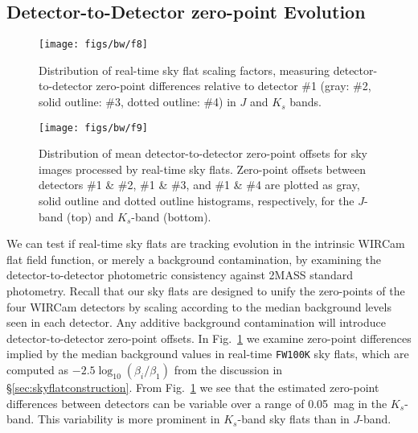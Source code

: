 \documentclass[iop,tighten]{emulateapj}
\newcommand{\Fig}[1]{Fig.~\ref{fig:#1}}  %
\newcommand{\Sec}[1]{\S\ref{sec:#1}}  %
\begin{document}
\subsection{Detector-to-Detector zero-point Evolution}
\label{sec:detector_zp}

\begin{figure}[t]
\centering
\texttt{[image: figs/bw/f8]}
\caption{Distribution of real-time sky flat scaling factors, measuring detector-to-detector zero-point differences relative to detector \#1 (gray: \#2, solid outline: \#3, dotted outline: \#4) in $J$ and $K_s$ bands.
}
\label{fig:fw100k_zpdiff}
\end{figure}

\begin{figure}[t]
\centering
\texttt{[image: figs/bw/f9]}
\caption{Distribution of mean detector-to-detector zero-point offsets for sky images processed by real-time sky flats.
Zero-point offsets between detectors \#1 \& \#2, \#1 \& \#3, and \#1 \& \#4 are plotted as
gray, solid outline and dotted outline histograms, respectively, for the $J$-band (top) and $K_s$-band (bottom).}
\label{fig:fw100k_chip_to_chip}
\end{figure}

We can test if real-time sky flats are tracking evolution in the intrinsic WIRCam flat field function, or merely a background contamination, by examining the detector-to-detector photometric consistency against 2MASS standard photometry.
Recall that our sky flats are designed to unify the zero-points of the four WIRCam detectors by scaling according to the median background levels seen in each detector.
Any additive background contamination will introduce detector-to-detector zero-point offsets.
In \Fig{fw100k_zpdiff} we examine zero-point differences implied by the median background values in real-time \texttt{FW100K} sky flats, which are computed as $-2.5 \log_{10}(\beta_i / \beta_1)$ from the discussion in \Sec{skyflatconstruction}.
From \Fig{fw100k_zpdiff} we see that the estimated zero-point differences between detectors can be variable over a range of 0.05~mag in the $K_s$-band.
This variability is more prominent in $K_s$-band sky flats than in $J$-band.
\end{document}
